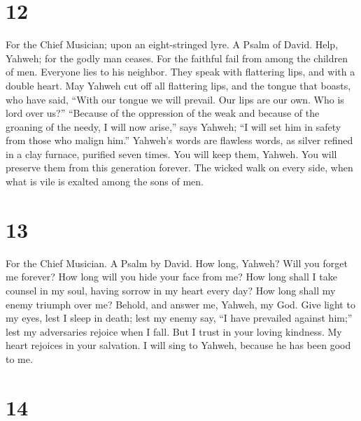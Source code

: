 \hypertarget{section-11}{%
\section{12}\label{section-11}}

For the Chief Musician; upon an eight-stringed lyre. A Psalm of David.
 Help, Yahweh; for the godly man ceases. For the faithful
fail from among the children of men.  Everyone lies to his
neighbor. They speak with flattering lips, and with a double heart.
 May Yahweh cut off all flattering lips, and the tongue
that boasts,  who have said, ``With our tongue we will
prevail. Our lips are our own. Who is lord over us?'' 
``Because of the oppression of the weak and because of the groaning of
the needy, I will now arise,'' says Yahweh; ``I will set him in safety
from those who malign him.''  Yahweh's words are flawless
words, as silver refined in a clay furnace, purified seven times.
 You will keep them, Yahweh. You will preserve them from
this generation forever.  The wicked walk on every side,
when what is vile is exalted among the sons of men.

\hypertarget{section-12}{%
\section{13}\label{section-12}}

For the Chief Musician. A Psalm by David.  How long,
Yahweh? Will you forget me forever? How long will you hide your face
from me?  How long shall I take counsel in my soul, having
sorrow in my heart every day? How long shall my enemy triumph over me?
 Behold, and answer me, Yahweh, my God. Give light to my
eyes, lest I sleep in death;  lest my enemy say, ``I have
prevailed against him;'' lest my adversaries rejoice when I fall.
 But I trust in your loving kindness. My heart rejoices in
your salvation.  I will sing to Yahweh, because he has
been good to me.

\hypertarget{section-13}{%
\section{14}\label{section-13}}

